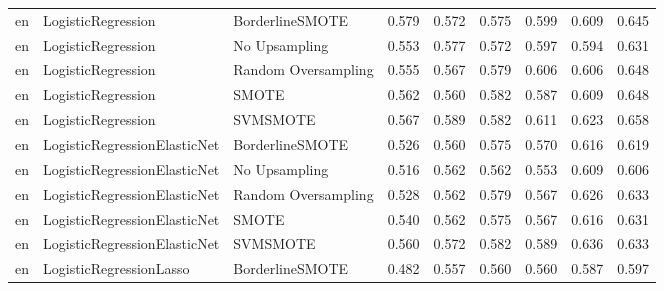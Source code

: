 \begin{tabular}{lllllllll}
      en &           LogisticRegression &     BorderlineSMOTE & 0.579 &                     0.572 &                 0.575 &                  0.599 &                                   0.609 &     0.645 \\
      en &           LogisticRegression &       No Upsampling & 0.553 &                     0.577 &                 0.572 &                  0.597 &                                   0.594 &     0.631 \\
      en &           LogisticRegression & Random Oversampling & 0.555 &                     0.567 &                 0.579 &                  0.606 &                                   0.606 &     0.648 \\
      en &           LogisticRegression &               SMOTE & 0.562 &                     0.560 &                 0.582 &                  0.587 &                                   0.609 &     0.648 \\
      en &           LogisticRegression &            SVMSMOTE & 0.567 &                     0.589 &                 0.582 &                  0.611 &                                   0.623 &     0.658 \\
      en & LogisticRegressionElasticNet &     BorderlineSMOTE & 0.526 &                     0.560 &                 0.575 &                  0.570 &                                   0.616 &     0.619 \\
      en & LogisticRegressionElasticNet &       No Upsampling & 0.516 &                     0.562 &                 0.562 &                  0.553 &                                   0.609 &     0.606 \\
      en & LogisticRegressionElasticNet & Random Oversampling & 0.528 &                     0.562 &                 0.579 &                  0.567 &                                   0.626 &     0.633 \\
      en & LogisticRegressionElasticNet &               SMOTE & 0.540 &                     0.562 &                 0.575 &                  0.567 &                                   0.616 &     0.631 \\
      en & LogisticRegressionElasticNet &            SVMSMOTE & 0.560 &                     0.572 &                 0.582 &                  0.589 &                                   0.636 &     0.633 \\
      en &      LogisticRegressionLasso &     BorderlineSMOTE & 0.482 &                     0.557 &                 0.560 &                  0.560 &                                   0.587 &     0.597 \\

\end{tabular}
